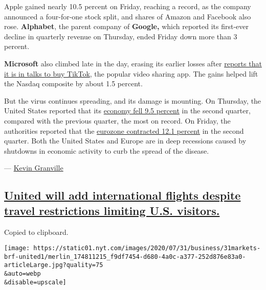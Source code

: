 Apple gained nearly 10.5 percent on Friday, reaching a record, as the
company announced a four-for-one stock split, and shares of Amazon and
Facebook also rose. \textbf{Alphabet}, the parent company of
\textbf{Google,} which reported its first-ever decline in quarterly
revenue on Thursday, ended Friday down more than 3 percent.

\textbf{Microsoft} also climbed late in the day, erasing its earlier
losses after
\href{https://www.nytimes.com/2020/07/31/technology/tiktok-microsoft.html}{reports
that it is in talks to buy TikTok}, the popular video sharing app. The
gains helped lift the Nasdaq composite by about 1.5 percent.

But the virus continues spreading, and its damage is mounting. On
Thursday, the United States reported that its
\href{https://www.nytimes.com/live/2020/07/30/business/stock-market-today-coronavirus/the-us-economys-contraction-in-the-second-quarter-was-the-worst-on-record}{economy
fell 9.5 percent} in the second quarter, compared with the previous
quarter, the most on record. On Friday, the authorities reported that
the
\href{https://www.nytimes.com/live/2020/07/31/business/stock-market-today-coronavirus/europes-contraction-is-its-worst-on-record}{eurozone
contracted 12.1 percent} in the second quarter. Both the United States
and Europe are in deep recessions caused by shutdowns in economic
activity to curb the spread of the disease.

--- \href{https://www.nytimes.com/by/kevin-granville}{Kevin Granville}

\hypertarget{united-will-add-international-flights-despite-travel-restrictions-limiting-us-visitors}{%
\subsection{\texorpdfstring{\protect\hyperlink{united-will-add-international-flights-despite-travel-restrictions-limiting-us-visitors}{United
will add international flights despite travel restrictions limiting U.S.
visitors.}}{United will add international flights despite travel restrictions limiting U.S. visitors.}}\label{united-will-add-international-flights-despite-travel-restrictions-limiting-us-visitors}}

Copied to clipboard.

\texttt{[image: https://static01.nyt.com/images/2020/07/31/business/31markets-brf-united1/merlin\_174811215\_f9df7454-d680-4a0c-a377-252d876e83a0-articleLarge.jpg?quality=75\\\&auto=webp\\\&disable=upscale]}

